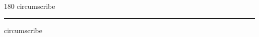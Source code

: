 
\begin{frame}
\begin{center}
\begin{turn}{180}
{\fontsize{2.5cm}{1em}\selectfont circumscribe}
\end{turn}
\vspace{1em}\par  
\hrule
\vspace{1em}\par  
{\fontsize{2.5cm}{1em}\selectfont circumscribe}
\end{center}
\end{frame}
